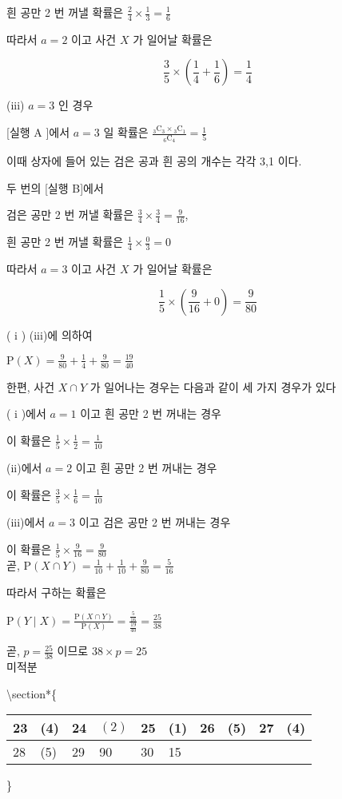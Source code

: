 \documentclass[10pt]{article}
\begin{document}
흰 공만 2 번 꺼낼 확률은 $\frac{2}{4} \times \frac{1}{3}=\frac{1}{6}$

따라서 $a=2$ 이고 사건 $X$ 가 일어날 확률은

\[
\frac{3}{5} \times\left(\frac{1}{4}+\frac{1}{6}\right)=\frac{1}{4}
\]

(iii) $a=3$ 인 경우

[실행 A ]에서 $a=3$ 일 확률은 $\frac{{ }_{3} \mathrm{C}_{3} \times{ }_{3} \mathrm{C}_{1}}{{ }_{6} \mathrm{C}_{4}}=\frac{1}{5}$

이때 상자에 들어 있는 검은 공과 흰 공의 개수는 각각 3,1 이다.

두 번의 [실행 B]에서

검은 공만 2 번 꺼낼 확률은 $\frac{3}{4} \times \frac{3}{4}=\frac{9}{16}$,

흰 공만 2 번 꺼낼 확률은 $\frac{1}{4} \times \frac{0}{3}=0$

따라서 $a=3$ 이고 사건 $X$ 가 일어날 확률은

\[
\frac{1}{5} \times\left(\frac{9}{16}+0\right)=\frac{9}{80}
\]

( i ) (iii)에 의하여

$\mathrm{P}(X)=\frac{9}{80}+\frac{1}{4}+\frac{9}{80}=\frac{19}{40}$

한편, 사건 $X \cap Y$ 가 일어나는 경우는 다음과 같이 세 가지 경우가 있다

( i )에서 $a=1$ 이고 흰 공만 2 번 꺼내는 경우

이 확률은 $\frac{1}{5} \times \frac{1}{2}=\frac{1}{10}$

(ii)에서 $a=2$ 이고 흰 공만 2 번 꺼내는 경우

이 확률은 $\frac{3}{5} \times \frac{1}{6}=\frac{1}{10}$

(iii)에서 $a=3$ 이고 검은 공만 2 번 꺼내는 경우

이 확률은 $\frac{1}{5} \times \frac{9}{16}=\frac{9}{80}$\\
곧, $\mathrm{P}(X \cap Y)=\frac{1}{10}+\frac{1}{10}+\frac{9}{80}=\frac{5}{16}$

따라서 구하는 확률은

$\mathrm{P}(Y \mid X)=\frac{\mathrm{P}(X \cap Y)}{\mathrm{P}(X)}=\frac{\frac{5}{16}}{\frac{19}{40}}=\frac{25}{38}$

곧, $p=\frac{25}{38}$ 이므로 $38 \times p=25$\\
미적분

\textbackslash section*\{\begin{tabular}{|l|l|l|l|l|l|l|l|l|l|}
\hline
23 & (4) & 24 & $(2)$ & 25 & (1) & 26 & (5) & 27 & (4) \\
\hline
28 & (5) & 29 & 90 & 30 & 15 &  &  &  &  \\
\hline
\end{tabular}\}
\end{document}
